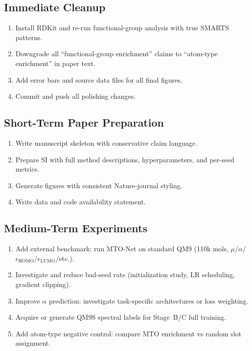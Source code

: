 \documentclass[11pt,a4paper]{article}
\begin{document}
\subsection{Immediate Cleanup}
\begin{enumerate}[nosep]
    \item Install RDKit and re-run functional-group analysis with true SMARTS patterns.
    \item Downgrade all ``functional-group enrichment'' claims to ``atom-type enrichment'' in paper text.
    \item Add error bars and source data files for all final figures.
    \item Commit and push all polishing changes.
\end{enumerate}

\subsection{Short-Term Paper Preparation}
\begin{enumerate}[nosep]
    \item Write manuscript skeleton with conservative claim language.
    \item Prepare SI with full method descriptions, hyperparameters, and per-seed metrics.
    \item Generate figures with consistent Nature-journal styling.
    \item Write data and code availability statement.
\end{enumerate}

\subsection{Medium-Term Experiments}
\begin{enumerate}[nosep]
    \item Add external benchmark: run MTO-Net on standard QM9 (110k mols, $\mu$/$\alpha$/$\epsilon_\text{HOMO}$/$\epsilon_\text{LUMO}$/etc.).
    \item Investigate and reduce bad-seed rate (initialization study, LR scheduling, gradient clipping).
    \item Improve $\alpha$ prediction: investigate task-specific architectures or loss weighting.
    \item Acquire or generate QM9S spectral labels for Stage~B/C full training.
    \item Add atom-type negative control: compare MTO enrichment vs random slot assignment.
\end{enumerate}
\end{document}
